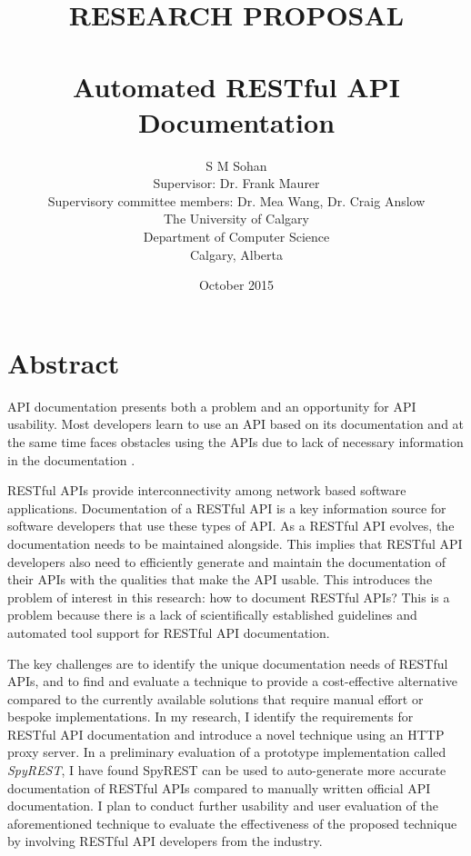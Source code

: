 \documentclass[11pt,oneside]{book}
\begin{document}
\title{RESEARCH PROPOSAL \\ $ $ \\
Automated RESTful API Documentation}

\author{S M Sohan \\
Supervisor: Dr. Frank Maurer \\
Supervisory committee members: Dr. Mea Wang, Dr. Craig Anslow\\
The University of Calgary \\
Department of Computer Science \\
Calgary, Alberta
}

\date{October 2015}


\maketitle
\tableofcontents
\frontmatter

% 

\chapter*{Abstract}
API documentation presents both a problem and an opportunity for API usability. Most developers learn to use an API based on its documentation and at the same time faces obstacles using the APIs due to lack of necessary information in the documentation \cite{Robillard_what_makes}.

RESTful APIs provide interconnectivity among network based software applications. Documentation of a RESTful API is a key information source for software developers that use these types of API. As a RESTful API evolves, the documentation needs to be maintained alongside. This implies that RESTful API developers also need to efficiently generate and maintain the documentation of their APIs with the qualities that make the API usable. This introduces the problem of interest in this research: how to document RESTful APIs? This is a problem because there is a lack of scientifically established guidelines and automated tool support for RESTful API documentation.

The key challenges are to identify the unique documentation needs of RESTful APIs, and to find and evaluate a technique to provide a cost-effective alternative compared to the currently available solutions that require manual effort or bespoke implementations. In my research, I identify the requirements for RESTful API documentation and introduce a novel technique using an HTTP proxy server. In a preliminary evaluation of a prototype implementation called \emph{SpyREST}, I have found SpyREST can be used to auto-generate more accurate documentation of RESTful APIs compared to manually written official API documentation. I plan to conduct further usability and user evaluation of the aforementioned technique to evaluate the effectiveness of the proposed technique by involving RESTful API developers from the industry.
\end{document}
